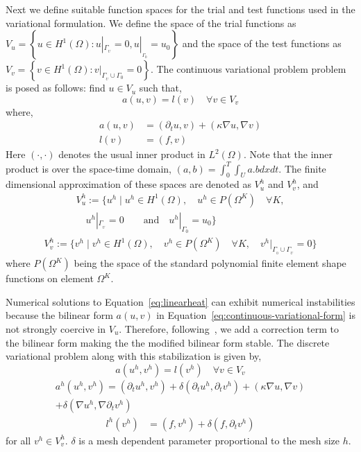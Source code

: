 Next we define suitable function spaces for the trial and test functions used in the variational formulation. We define the space of the trial functions as $V_u = \left\{u\in H^1(\Omega): u|_{\Gamma_{_U}} = 0, u|_{_{\Gamma_0}} = u_0 \right\}$ and the space of the test functions as $V_v = \left\{v\in H^1(\Omega): v|_{\Gamma_{_U}\cup\Gamma_0} = 0\right\}$. The continuous variational problem problem is posed as follows: find $u\in V_u$ such that,
\begin{equation}\label{eq:continuous-variational-form}
    a(u, v) = l(v)\quad \forall v \in V_v
\end{equation}
where,
\begin{align}\label{def:continuous-bilinear-form}
    a(u,v) &= (\partial_t u, v) + (\kappa \nabla u, \nabla v)\\
    l(v) &= (f,v)
\end{align}
Here $(\cdot,\cdot)$ denotes the usual inner product in $L^2(\Omega)$. Note that the inner product is over the space-time domain, $(a,b) = \int_0^T \int_U a.b dx dt$. The finite dimensional approximation of these spaces are denoted as $V^h_u$ and $V^h_v$, and 
\begin{multline}
    V^h_u := \{u^h \mid u^h \in H^1(\Omega), \quad u^h\in P(\Omega ^K) \quad \forall K,\\
    \quad u^h|_{\Gamma_{_U}} = 0 \qquad\textrm{and}\quad u^h|_{\Gamma_{0}} = u_{0}\}
\end{multline}
\begin{align}
    V^h_v := \{v^h \mid v^h \in H^1(\Omega), \quad v^h\in P(\Omega^K) \quad \forall K, \quad v^h|_{\Gamma_{_0}\cup\Gamma_{_U}} = 0\}
\end{align}
where $P(\Omega ^K)$ being the space of the standard polynomial finite element shape functions on element $\Omega^K$. 

Numerical solutions to Equation~\ref{eq:linearheat} can exhibit numerical instabilities because the bilinear form $a(u,v)$ in Equation~\ref{eq:continuous-variational-form} is not strongly coercive in $V_u$. Therefore, following~\cite{langer2016space}, we add a correction term to the bilinear form making the the modified bilinear form stable. The discrete variational problem along with this stabilization is given by,
\begin{equation}\label{eq:discrete-variational-form}
    a(u^h, v^h) = l(v^h)\quad \forall v \in V_v
\end{equation}
\begin{multline}\label{def:discrete-bilinear-form}
    a^h(u^h,v^h) = (\partial_t u^h, v^h) + \delta (\partial_t u^h, \partial_t v^h) + (\kappa \nabla u, \nabla v) \\
     + \delta (\nabla u^h,\nabla \partial_t v^h)
\end{multline}
\begin{align}\label{def:discrete-linear-form}
    l^h(v^h) &= (f,v^h) + \delta(f,\partial_t v^h)
\end{align}
for all $v^h \in V^h_v$. $\delta$ is a mesh dependent parameter proportional to the mesh size $h$.

